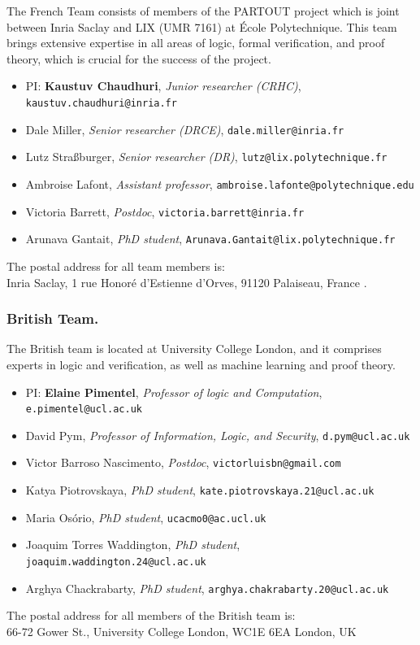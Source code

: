 \documentclass[a4paper]{article}
\newcommand{\fmemb}[4]{\item #1, \emph{#2}, {\tt #3}}
\newcommand{\sacaddr}{%
  Inria Saclay, 1 r. Honoré d'Estienne d'Orves, %
  91120 Palaiseau, France}
\newcommand{\sacaddrb}{%
  Inria Saclay, 1 rue Honor\'{e} d'Estienne d'Orves, %
  91120 Palaiseau, %
  France
}
\begin{document}
The French Team consists of members of the {\sc PARTOUT} project which is joint between Inria Saclay and LIX (UMR 7161) at \'{E}cole Polytechnique. This team brings extensive expertise in all areas of logic, formal verification, and proof theory, which is crucial for the success of the project.

\begin{itemize}[noitemsep]
\fmemb{PI: \textbf{Kaustuv Chaudhuri}}{Junior researcher (CRHC)}{kaustuv.chaudhuri@inria.fr}{\sacaddr}

\fmemb{Dale Miller}{Senior researcher (DRCE)}{dale.miller@inria.fr}{\sacaddr}

\fmemb{Lutz Stra\ss burger}{Senior researcher (DR)}{lutz@lix.polytechnique.fr}{\sacaddr}

\fmemb{Ambroise Lafont}{Assistant professor}{ambroise.lafonte@polytechnique.edu}{\sacaddr}

\fmemb{Victoria Barrett}{Postdoc}{victoria.barrett@inria.fr}{\sacaddr}

\fmemb{Arunava Gantait}{PhD student}{Arunava.Gantait@lix.polytechnique.fr}{\sacaddr}
\end{itemize}
The postal address for all team members is:\\[.5ex] \sacaddrb.


\subsubsection*{British Team.}

The British team is located at University College London, and it comprises experts in logic and verification, as well as machine learning and proof theory.
%
\begin{itemize}[noitemsep]
\fmemb{PI: \textbf{Elaine Pimentel}}{Professor of logic and Computation}{e.pimentel@ucl.ac.uk}{66-72 Gowe
r St., University College London,
WC1E 6EA London, UK}

\fmemb{David Pym}{Professor of Information, Logic, and Security}{d.pym@ucl.ac.uk}{66-72 Gower St., University College London,
WC1E 6EA London, UK}

\fmemb{Victor Barroso Nascimento}{Postdoc}{victorluisbn@gmail.com}{66-72 Gower St., University College London,
WC1E 6EA London, UK}

\fmemb{Katya Piotrovskaya}{PhD student}{kate.piotrovskaya.21@ucl.ac.uk}{66-72 Gower St., University College London,
WC1E 6EA London, UK}

\fmemb{Maria Os\'{o}rio}{PhD student}{ucacmo0@ac.ucl.uk}{66-72 Gower St., University College London,
WC1E 6EA London, UK}

\fmemb{Joaquim Torres Waddington}{PhD student}{joaquim.waddington.24@ucl.ac.uk}{66-72 Gower St., University College London,
WC1E 6EA London, UK}

\fmemb{Arghya Chackrabarty}{PhD student}{arghya.chakrabarty.20@ucl.ac.uk}{66-72 Gower St., University College London,
WC1E 6EA London, UK}

\end{itemize}
%
The postal address for all members of the British team is:\\[.75ex]
66-72 Gower St., University College London,
WC1E 6EA London, UK
\end{document}
